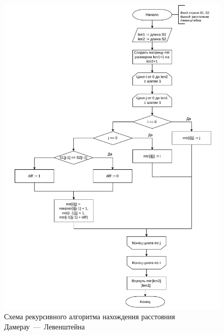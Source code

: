 \begin{figure}[h]
	\centering
	\includegraphics[height=0.9\textheight, page=3]{algo-scheme.pdf}
	\caption{Схема рекурсивного алгоритма нахождения расстояния Дамерау~---~Левенштейна}
	\label{fig:dam-lev-rec}
\end{figure}

\clearpage

